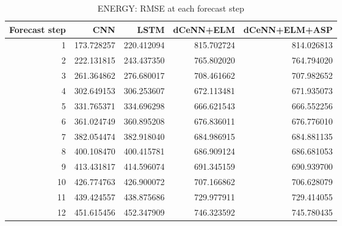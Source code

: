 \begin{table}
\caption{ENERGY: RMSE at each forecast step}
\begin{tabular}{rrrrr}
\toprule
Forecast step & CNN & LSTM & dCeNN+ELM & dCeNN+ELM+ASP \\
\midrule
1 & 173.728257 & 220.412094 & 815.702724 & 814.026813 \\
2 & 222.131815 & 243.437350 & 765.802020 & 764.794020 \\
3 & 261.364862 & 276.680017 & 708.461662 & 707.982652 \\
4 & 302.649153 & 306.253607 & 672.113481 & 671.935073 \\
5 & 331.765371 & 334.696298 & 666.621543 & 666.552256 \\
6 & 361.024749 & 360.895208 & 676.836011 & 676.776010 \\
7 & 382.054474 & 382.918040 & 684.986915 & 684.881135 \\
8 & 400.108470 & 400.415781 & 686.909124 & 686.681053 \\
9 & 413.431817 & 414.596074 & 691.345159 & 690.939700 \\
10 & 426.774763 & 426.900072 & 707.166862 & 706.628079 \\
11 & 439.424557 & 438.875686 & 729.977911 & 729.414055 \\
12 & 451.615456 & 452.347909 & 746.323592 & 745.780435 \\
\bottomrule
\end{tabular}
\end{table}
